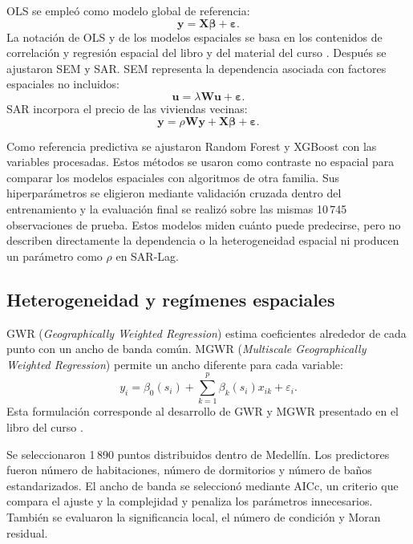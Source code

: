 \documentclass[conference]{IEEEtran}
\begin{document}
OLS se empleó como modelo global de referencia:
\begin{equation*}
    \mathbf{y}=\mathbf{X}\boldsymbol{\beta}+\boldsymbol{\varepsilon}.
\end{equation*}
La notación de OLS y de los modelos espaciales se basa en los contenidos de correlación y regresión espacial del libro y del material del curso \cite{librocurso,materialcurso}. Después se ajustaron SEM y SAR. SEM representa la dependencia asociada con factores espaciales no incluidos:
\begin{equation*}
    \mathbf{u}=\lambda\mathbf{W}\mathbf{u}+\boldsymbol{\varepsilon}.
\end{equation*}
SAR incorpora el precio de las viviendas vecinas:
\begin{equation*}
    \mathbf{y}=\rho\mathbf{W}\mathbf{y}
    +\mathbf{X}\boldsymbol{\beta}+\boldsymbol{\varepsilon}.
\end{equation*}

Como referencia predictiva se ajustaron Random Forest y XGBoost con las variables procesadas. Estos métodos se usaron como contraste no espacial para comparar los modelos espaciales con algoritmos de otra familia. Sus hiperparámetros se eligieron mediante validación cruzada dentro del entrenamiento y la evaluación final se realizó sobre las mismas 10\,745 observaciones de prueba. Estos modelos miden cuánto puede predecirse, pero no describen directamente la dependencia o la heterogeneidad espacial ni producen un parámetro como $\rho$ en SAR-Lag.

\subsection{Heterogeneidad y regímenes espaciales}

GWR (\emph{Geographically Weighted Regression}) estima coeficientes alrededor de cada punto con un ancho de banda común. MGWR (\emph{Multiscale Geographically Weighted Regression}) permite un ancho diferente para cada variable:
\begin{equation*}
    y_i=\beta_0(s_i)+\sum_{k=1}^{p}\beta_k(s_i)x_{ik}+\varepsilon_i.
\end{equation*}
Esta formulación corresponde al desarrollo de GWR y MGWR presentado en el libro del curso \cite{librocurso}.

Se seleccionaron 1\,890 puntos distribuidos dentro de Medellín. Los predictores fueron número de habitaciones, número de dormitorios y número de baños estandarizados. El ancho de banda se seleccionó mediante AICc, un criterio que compara el ajuste y la complejidad y penaliza los parámetros innecesarios. También se evaluaron la significancia local, el número de condición y Moran residual.
\end{document}
